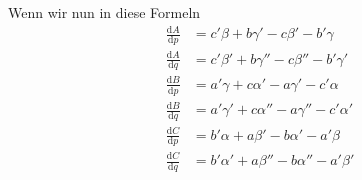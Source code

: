 Wenn wir nun in diese Formeln
\[
\begin{aligned}
\frac{\mathrm{d}A}{\mathrm{d}p}&=c'\beta+b\gamma'-c\beta'-b'\gamma\\
\frac{\mathrm{d}A}{\mathrm{d}q}&=c'\beta'+b\gamma''-c\beta''-b'\gamma'\\
\frac{\mathrm{d}B}{\mathrm{d}p}&=a'\gamma+c\alpha'-a\gamma'-c'\alpha\\
\frac{\mathrm{d}B}{\mathrm{d}q}&=a'\gamma'+c\alpha''-a\gamma''-c'\alpha'\\
\frac{\mathrm{d}C}{\mathrm{d}p}&=b'\alpha+a\beta'-b\alpha'-a'\beta\\
\frac{\mathrm{d}C}{\mathrm{d}q}&=b'\alpha'+a\beta''-b\alpha''-a'\beta'
\end{aligned}
\]
